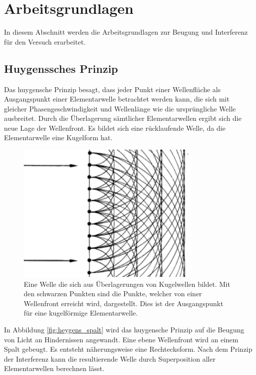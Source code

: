 \section{Arbeitsgrundlagen}
In diesem Abschnitt werden die Arbeitsgrundlagen zur Beugung und Interferenz für den Versuch erarbeitet.
\subsection{Huygenssches Prinzip}
Das huygensche Prinzip besagt, dass jeder Punkt einer Wellenfläche als Ausgangspunkt einer Elementarwelle betrachtet werden kann, die sich mit gleicher Phasengeschwindigkeit und Wellenlänge wie die ursprüngliche Welle ausbreitet. Durch die Überlagerung sämtlicher Elementarwellen ergibt sich die neue Lage der Wellenfront. Es bildet sich eine rücklaufende Welle, da die Elementarwelle eine Kugelform hat.

\begin{figure}[h!]
	\centering
	\includegraphics[width=0.8\textwidth]{data/huygens}
	\caption{Eine Welle die sich aus Überlagerungen von Kugelwellen bildet. Mit den schwarzen Punkten sind die Punkte, welcher von einer Wellenfront erreicht wird, dargestellt. Dies ist der Ausgangspunkt für eine kugelförmige Elementarwelle. }
	\label{fig:heygens}
\end{figure}
\newpage

In Abbildung \ref{fig:heygens_spalt} wird das huygensche Prinzip auf die Beugung von Licht an Hindernissen angewandt. Eine ebene Wellenfront wird an einem Spalt gebeugt. Es entsteht näherungsweise eine Rechtecksform. Nach dem Prinzip der Interferenz kann die resultierende Welle durch Superposition aller Elementarwellen berechnen lässt. 

